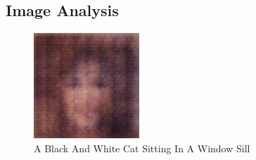 \documentclass{article}%
\begin{document}
%
\subsection{Image Analysis}%
\label{subsec:ImageAnalysis}%


\begin{figure}[h!]%
\centering%
\includegraphics[width=150px]{500_fake_images/samples_5_462.png}%
\caption{A Black And White Cat Sitting In A Window Sill}%
\end{figure}

%
\end{document}
